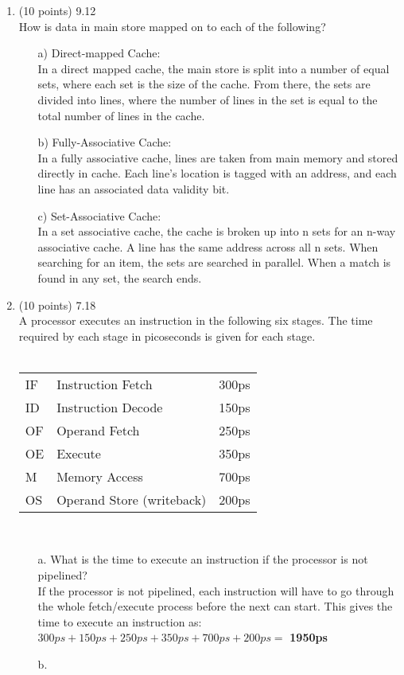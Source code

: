 \documentclass[letterpaper,10pt,onecolumn,titlepage]{article}
\begin{document}
\begin{enumerate}
\item (10 points) 9.12 \\
	How is data in main store mapped on to each of the following?
	\begin{enumerate}
		\item[a)] Direct-mapped Cache: \\
			In a direct mapped cache, the main store is split into a number of
			equal sets, where each set is the size of the cache. From there,
			the sets are divided into lines, where the number of lines in the
			set is equal to the total number of lines in the cache.
		\item[b)] Fully-Associative Cache: \\
			In a fully associative cache, lines are taken from main memory and
			stored directly in cache. Each line's location is tagged with an
			address, and each line has an associated data validity bit.
		\item[c)] Set-Associative Cache: \\
			In a set associative cache, the cache is broken up into n sets for
			an n-way associative cache. A line has the same address across all
			n sets. When searching for an item, the sets are searched in
			parallel. When a match is found in any set, the search ends.
	\end{enumerate}

\item (10 points) 7.18 \\
	A processor executes an instruction in the following six stages. The time required
	by each stage in picoseconds is given for each stage.\\
	\\
	\begin{tabular}{ l l l }
		IF & Instruction Fetch & 300ps \\
		ID & Instruction Decode & 150ps \\
		OF & Operand Fetch & 250ps \\
		OE & Execute & 350ps \\
		 M & Memory Access & 700ps \\
		OS & Operand Store (writeback) & 200ps \\
	\end{tabular} \\

	\begin{enumerate}
		\item[a.] What is the time to execute an instruction if the processor is
			not pipelined? \\
			If the processor is not pipelined, each instruction will have to
			go through the whole fetch/execute process before the next can
			start. This gives the time to execute an instruction as: \\
			$300ps + 150ps + 250ps + 350ps + 700ps + 200ps =$ \textbf{1950ps}
		\item[b.]
	\end{enumerate}


\end{enumerate}
\end{document}
